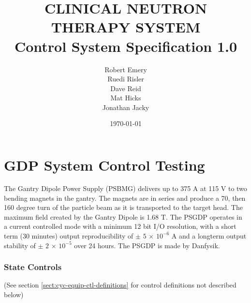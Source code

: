 \documentclass[11pt]{book}		%
\title{CLINICAL NEUTRON THERAPY SYSTEM\\
	Control System Specification 1.0\\[1.0cm]}
\author{Robert Emery\\
	Ruedi Risler\\
	Dave Reid \\
	Mat Hicks \\
        Jonathan Jacky}
\date{\today}
\begin{document}
\chapter{GDP System Control Testing}

The Gantry Dipole Power Supply (PSBMG) delivers up to 375 A at 115 V to two bending magnets in the gantry. The magnets are in series and produce a 70, then 160 degree turn of the particle beam as it is transported to the target head. The maximum field created by the Gantry Dipole is 1.68 T. The PSGDP operates in a current controlled mode with a minimum 12 bit I/O resolution, with a short term (30 minutes) output reproducibility of $\pm$ $5$ $\times$ $10^{-6}$ A and a longterm output stability of $\pm$ $2$ $\times$ $10^{-5}$ over 24 hours. The PSGDP is made by Danfysik. 


\subsection{State Controls} \label{sect:cyc-equip-ctl-beamline-gdp-state-controls}
(See section \ref{sect:cyc-equip-ctl-definitions} for control definitions not described below)
\end{document}
